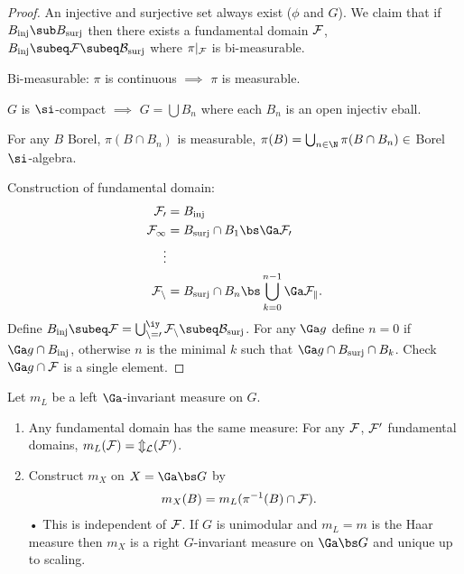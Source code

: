 \begin{proof}
An injective and surjective set always exist ($\phi$ and $G$). We claim that if $B_{\text{inj}}\sub B_{\text{surj}}$ then there exists a fundamental domain $\cal F$, $B_{\text{inj}}\subeq \cal F \subeq B_{\text{surj}}$ where $\pi|_{\cal F}$ is bi-measurable. 

Bi-measurable: $\pi$ is continuous $\implies $ $\pi$ is measurable. 

$G$ is $\si$-compact $\implies$ $G=\bigcup B_n$ where each $B_n$ is an open injectiv eball.

For any $B$ Borel, $\pi(B\cap B_n)$ is measurable, $\pi(B) = \bigcup_{n\in \N} \pi(B\cap B_n)\in $ Borel $\si$-algebra.

Construction of fundamental domain: 
\begin{align}
\cal F_0 &= B_{\text{inj}}\\
\cal F_1 &= B_{\text{surj}} \cap B_1 \bs \Ga \cal F_0\\
\vdots &\\
\cal F_n &= B_{\text{surj}} \cap B_n \bs \bigcup_{k=0}^{n-1} \Ga \cal F_k.
\end{align}
Define $B_{\text{inj}}\subeq \cal F = \bigcup_{n=0}^\iy \cal F_n \subeq B_{\text{surj}}$. For any $\Ga g$ define $n=0$ if $\Ga g\cap B_{{\text{inj}}}$, otherwise $n$ is the minimal $k$ such that $\Ga g \cap B_{\text{surj}} \cap B_k$. Check $\Ga g\cap \cal F$ is a single element. 
\end{proof}
\begin{pr}

\end{pr}
Let $m_L$ be a left $\Ga$-invariant measure on $G$. 
\begin{enumerate}
\item
Any fundamental domain has the same measure: 
For any $\cal F$, $\cal F'$ fundamental domains, $m_L(\cal F)=m_L(\cal F')$.
\item
Construct $m_X$ on $X=\Ga\bs G$ by 
\begin{align}
m_X(B) & = m_L (\pi^{-1} (B)\cap \cal F).
\end{align}•
This is independent of $\cal F$. 
If $G$ is unimodular and $m_L=m$ is the Haar measure then $m_X$ is a right $G$-invariant measure on $\Ga\bs G$ and unique up to scaling.
\end{enumerate}
